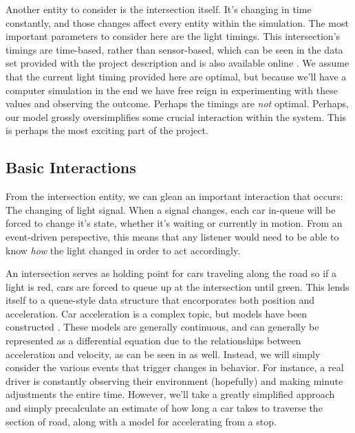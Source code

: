 \documentclass[a4paper,12pt]{article}
\begin{document}
Another entity to consider is the intersection itself. It's changing in time constantly, and those changes affect
every entity within the simulation. The most important parameters to consider here are the light timings. This
intersection's timings are time-based, rather than sensor-based, which can be seen in the data set provided with the
project description and is also available online \cite{ngsim}. We assume that the current light timing provided here
are optimal, but because we'll have a computer simulation in the end we have free reign in experimenting with these
values and observing the outcome. Perhaps the timings are \emph{not} optimal. Perhaps, our model grossly oversimplifies
some crucial interaction within the system. This is perhaps the most exciting part of the project.

\subsection{Basic Interactions}
From the intersection entity, we can glean an important interaction that occurs: The changing of light signal. When a
signal changes, each car in-queue will be forced to change it's state, whether it's waiting or currently in motion.
From an event-driven perspective, this means that any listener would need to be able to know \emph{how} the light
changed in order to act accordingly.

An intersection serves as holding point for cars traveling along the road so if a light is red, cars are forced to
queue up at the intersection until green. This lends itself to a queue-style data structure that encorporates both
position and acceleration. Car acceleration is a complex topic, but models have been constructed \cite{bonneson}
\cite{herman_et_al}. These models are generally continuous, and can generally be represented as a differential equation
due to the relationships between acceleration and velocity, as can be seen in \cite{briggs} \cite{deceleration} as well.
Instead, we will simply consider the various events that trigger changes in behavior. For instance, a real driver is
constantly observing their environment (hopefully) and making minute adjustments the entire time. However, we'll take
a greatly simplified approach and simply precalculate an estimate of how long a car takes to traverse the section of
road, along with a model for accelerating from a stop.
\end{document}
